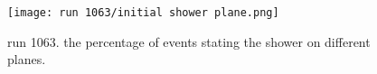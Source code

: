 \documentclass[11pt]{article}
\begin{document}
\begin{figure}[h]
    \centering  \texttt{[image: run 1063/initial shower plane.png]}
    \caption{run 1063. the percentage of events stating the shower on different planes.}
    \label{empty first planes run 1101}
\end{figure}






































\medskip
\printbibliography
\end{document}
